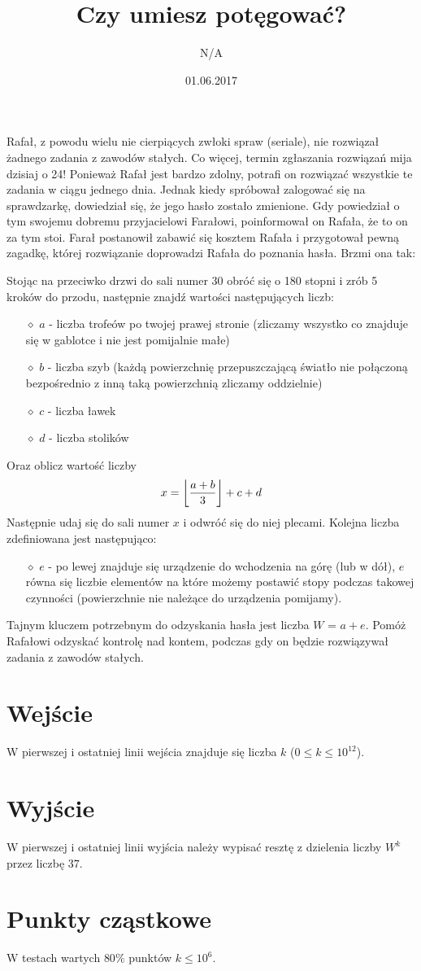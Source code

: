 \documentclass[zad,zawodnik,utf8]{sinol}
\title{Czy umiesz potęgować?}
\author{N/A} %
\date{01.06.2017}
\DeclarePairedDelimiter\floor{\lfloor}{\rfloor}
\begin{document}
\begin{tasktext}

	Rafał, z powodu wielu nie cierpiących zwłoki spraw (seriale), nie rozwiązał żadnego zadania z zawodów stałych. Co więcej, termin zgłaszania
rozwiązań mija dzisiaj o 24! Ponieważ Rafał jest bardzo zdolny, potrafi on rozwiązać wszystkie te zadania w ciągu jednego dnia. Jednak kiedy spróbował zalogować się na sprawdzarkę, dowiedział się, że jego hasło zostało zmienione. Gdy powiedział o tym swojemu dobremu przyjacielowi Farałowi, poinformował on Rafała, że to on za tym stoi. Farał postanowił zabawić się kosztem Rafała i przygotował pewną zagadkę, której rozwiązanie doprowadzi Rafała do poznania hasła. Brzmi ona tak:

Stojąc na przeciwko drzwi do sali numer 30 obróć się o 180 stopni i zrób 5 kroków do przodu, następnie znajdź wartości następujących liczb:
	\begin{itemize}
		\item[$\diamond$] $a$ - liczba trofeów po twojej prawej stronie (zliczamy wszystko co znajduje się w gablotce i nie jest pomijalnie małe)
		\item[$\diamond$] $b$ - liczba szyb (każdą powierzchnię przepuszczającą światło nie połączoną bezpośrednio z inną taką powierzchnią zliczamy oddzielnie)
		\item[$\diamond$] $c$ - liczba ławek
		\item[$\diamond$] $d$ - liczba stolików
	\end{itemize}
Oraz oblicz wartość liczby 
 \begin{equation*}
     x = \floor*{\frac{a+b}{3}} + c + d
 \end{equation*}
Następnie udaj się do sali numer $x$ i odwróć się do niej plecami. Kolejna liczba zdefiniowana jest następująco:
	\begin{itemize}
		\item[$\diamond$] $e$ - po lewej znajduje się urządzenie do wchodzenia na górę (lub w dół), $e$ równa się liczbie elementów na które możemy postawić stopy podczas takowej czynności (powierzchnie nie należące do urządzenia pomijamy).
	\end{itemize}
Tajnym kluczem potrzebnym do odzyskania hasła jest liczba $W$ = $a + e$. Pomóż Rafałowi odzyskać kontrolę nad kontem, podczas gdy on będzie rozwiązywał zadania z zawodów stałych.

  	\section{Wejście}
W pierwszej i ostatniej linii wejścia znajduje się liczba $k$ ($0 \leq k \leq 10^{12}$).
	\section{Wyjście}
W pierwszej i ostatniej linii wyjścia należy wypisać resztę z dzielenia liczby $W^{k}$ przez liczbę $37$.
	\makecompactexample
	\section{Punkty cząstkowe}
	W testach wartych $80\%$ punktów $k \leq 10^6$.

\end{tasktext}
\end{document}
